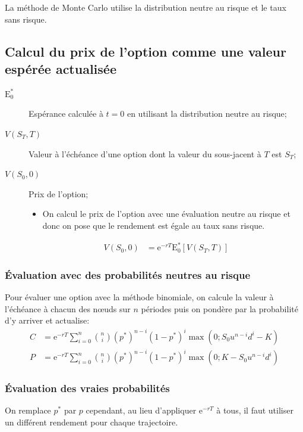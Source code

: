 \documentclass[10pt, french]{article}
\begin{document}
\begin{multicols*}{2}
La méthode de Monte Carlo utilise la distribution neutre au risque et le taux sans risque.

\subsection{Calcul du prix de l'option comme une valeur espérée actualisée}
\begin{distributions}[Notation]
\begin{description}
	\item[$\text{E}_{0}^{*}$]	Espérance calculée à $t	=	0$ en utilisant la distribution neutre au risque;
	\item[$V(S_{T}, T)$]	Valeur à l'échéance d'une option dont la valeur du sous-jacent à $T$ est $S_{T}$;
	\item[$V(S_{0}, 0)$]	Prix de l'option;
		\begin{itemize}[leftmargin = *]
		\item	On calcul le prix de l'option avec une évaluation neutre au risque et donc on pose que le rendement est égale au taux sans risque.
		\end{itemize}
		\begin{align*}
		V(S_{0}, 0)	
		&=	\textrm{e}^{-rT}\text{E}_{0}^{*}[V(S_{T}, T)]
		\end{align*}
\end{description}
\end{distributions}

\subsubsection*{Évaluation avec des probabilités neutres au risque}
Pour évaluer une option avec la méthode binomiale, on calcule la valeur à l'échéance à chacun des nœuds sur $n$ périodes puis on pondère par la probabilité d'y arriver et actualise:
\begin{align*}
	C
	&=	\textrm{e}^{-rT} \sum_{i	=	0}^{n} \binom{n}{i} (p^{*})^{n	-	i}(1	-	p^{*})^{i} \max(0;	S_{0}u^{n	-	i}d^{i}	-	K)	\\
	P
	&=	\textrm{e}^{-rT} \sum_{i	=	0}^{n} \binom{n}{i} (p^{*})^{n	-	i}(1	-	p^{*})^{i} \max(0;	K	-	S_{0}u^{n	-	i}d^{i})	
\end{align*}

\subsubsection*{Évaluation des vraies probabilités}
On remplace $p^{*}$ par $p$ cependant, au lieu d'appliquer $\textrm{e}^{-rT}$ à tous, il faut utiliser un différent rendement pour chaque trajectoire.



\end{multicols*}
\end{document}
